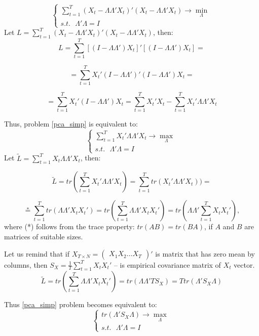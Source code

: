 \documentclass[a4paper, 14pt]{article}
\begin{document}
\begin{equation} \label{pca_simp}
\begin{cases}
\sum_{t=1}^{T} (X_t - \Lambda \Lambda'X_t)'(X_t - \Lambda \Lambda'X_t) \rightarrow \min_{\Lambda} \\
s.t. \text{ } \Lambda'\Lambda = I
\end{cases}
\end{equation}
Let $L = \sum_{t=1}^{T} (X_t - \Lambda \Lambda'X_t)'(X_t - \Lambda \Lambda'X_t)$, then:
\[ L=\sum_{t=1}^{T} \left[(I - \Lambda \Lambda') X_t \right] ' \left[(I- \Lambda \Lambda') X_t \right] = 
\]

\[ =\sum_{t=1}^{T} X_t'(I - \Lambda \Lambda')'(I - \Lambda \Lambda') X_t = 
\]

\[
 =\sum_{t=1}^{T} X_t'(I - \Lambda \Lambda') X_t = \sum_{t=1}^{T} X_t' X_t - \sum_{t=1}^{T} X_t' \Lambda \Lambda' X_t	
\]

\noindent Thus, problem \eqref{pca_simp} is equivalent to: 
\begin{equation}
	\begin{cases}
	\sum_{t=1}^{T} X_t' \Lambda \Lambda' X_t \rightarrow \max_{\Lambda} \\
	s.t. \text{ } \Lambda'\Lambda = I
	\end{cases}
\end{equation}
Let $\tilde{L} = \sum_{t=1}^{T} X_t \Lambda \Lambda' X_t$, then:

\[\tilde{L} = tr(\sum_{t=1}^{T} X_t' \Lambda \Lambda' X_t) =  \sum_{t=1}^{T} tr( X_t' \Lambda \Lambda' X_t) ) = \]
 
\[\stackrel{\text{*}}{=} \sum_{t=1}^{T} tr(\Lambda \Lambda' X_t X_t') = 
tr(\sum_{t=1}^T \Lambda \Lambda' X_t X_t') = tr(\Lambda \Lambda' \sum_{t=1}^T  X_t X_t'), \] where (*) follows from the trace property: $tr(AB) = tr(BA)$, if $A$ and $B$ are matrices of suitable sizes.
 
\noindent Let us remind that if $X_{T \times N} = \begin{pmatrix}
X_1 X_2 \dotsc X_T
\end{pmatrix}'$ is matrix that has zero mean by columns, then $S_X = \frac{1}{T} \sum_{t=1}^T  X_t X_t'$ -- is empirical covariance matrix of $X_t$ vector.
\[\tilde{L} = tr(\sum_{t=1}^T \Lambda \Lambda' X_t X_t') = tr(\Lambda \Lambda' T S_X) = T tr(\Lambda' S_X \Lambda)\]

\noindent Thus \eqref{pca_simp} problem becomes equivalent to:
\begin{equation}\label{pca_final}
	\begin{cases}
	tr(\Lambda' S_X \Lambda) \rightarrow \max_{\Lambda} \\
	s.t. \text{ } \Lambda'\Lambda = I
	\end{cases}
\end{equation}
\end{document}
